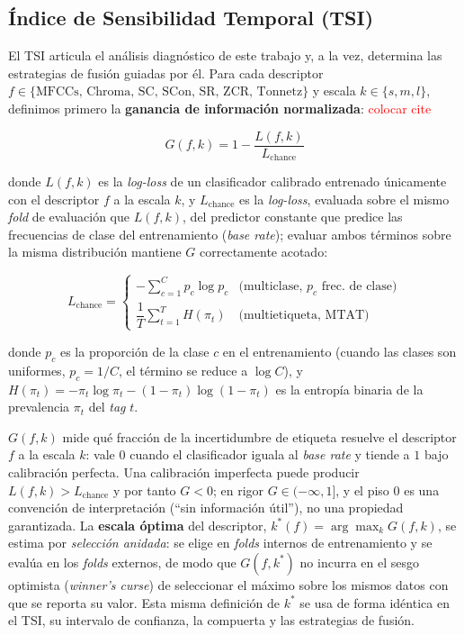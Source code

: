 \documentclass[conference]{IEEEtran}
\begin{document}
\subsection{Índice de Sensibilidad Temporal (TSI)}
\label{subsec:tsi}


El TSI articula el análisis diagnóstico de este trabajo y, a la vez, determina las estrategias de fusión guiadas por él. Para cada descriptor $f \in \{\text{MFCCs, Chroma, SC, SCon, SR, ZCR, Tonnetz}\}$ y escala $k \in \{s, m, l\}$, definimos primero la \textbf{ganancia de información normalizada}: \textcolor{red}{colocar cite}

\begin{equation}
    G(f, k) = 1 - \frac{L(f, k)}{L_{\text{chance}}}
    \label{eq:gain}
\end{equation}

\noindent donde $L(f, k)$ es la \textit{log-loss} de un clasificador calibrado entrenado únicamente con el descriptor $f$ a la escala $k$, y $L_{\text{chance}}$ es la \textit{log-loss}, evaluada sobre el mismo \textit{fold} de evaluación que $L(f,k)$, del predictor constante que predice las frecuencias de clase del entrenamiento (\textit{base rate}); evaluar ambos términos sobre la misma distribución mantiene $G$ correctamente acotado:

\begin{equation}
    L_{\text{chance}} = \begin{cases}
        -\displaystyle\sum_{c=1}^{C} p_c \log p_c & \text{(multiclase, } p_c \text{ frec.\ de clase)} \\[4pt]
        \dfrac{1}{T}\sum_{t=1}^{T} H(\pi_t) & \text{(multietiqueta, MTAT)}
    \end{cases}
    \label{eq:lchance}
\end{equation}

\noindent donde $p_c$ es la proporción de la clase $c$ en el entrenamiento (cuando las clases son uniformes, $p_c=1/C$, el término se reduce a $\log C$), y $H(\pi_t) = -\pi_t \log \pi_t - (1-\pi_t)\log(1-\pi_t)$ es la entropía binaria de la prevalencia $\pi_t$ del \textit{tag} $t$.

$G(f,k)$ mide qué fracción de la incertidumbre de etiqueta resuelve el descriptor $f$ a la escala $k$: vale $0$ cuando el clasificador iguala al \textit{base rate} y tiende a $1$ bajo calibración perfecta. Una calibración imperfecta puede producir $L(f,k) > L_{\text{chance}}$ y por tanto $G < 0$; en rigor $G \in (-\infty, 1]$, y el piso $0$ es una convención de interpretación (``sin información útil''), no una propiedad garantizada. La \textbf{escala óptima} del descriptor, $k^*(f) = \arg\max_k G(f,k)$, se estima por \emph{selección anidada}: se elige en \textit{folds} internos de entrenamiento y se evalúa en los \textit{folds} externos, de modo que $G(f,k^*)$ no incurra en el sesgo optimista (\textit{winner's curse}) de seleccionar el máximo sobre los mismos datos con que se reporta su valor. Esta misma definición de $k^*$ se usa de forma idéntica en el TSI, su intervalo de confianza, la compuerta y las estrategias de fusión.
\end{document}

